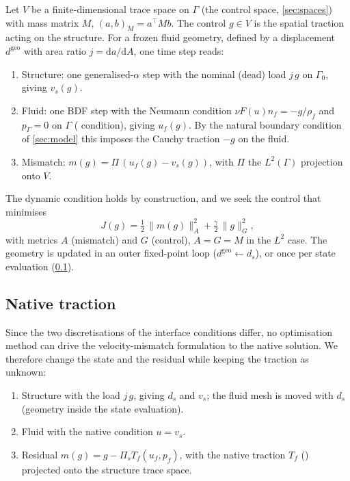 \documentclass[11pt,a4paper]{article}
\theoremstyle{definition}
\theoremstyle{remark}
\newcommand{\G}{\Gamma}
\newcommand{\M}{M}
\newcommand{\Pis}{\Pi_{s}}
\begin{document}
Let $V$ be a finite-dimensional trace space on $\G$ (the control space, \cref{sec:spaces}) with
mass matrix $\M$, $(a,b)_{\M}=a^{\top}\M b$. The control $g\in V$ is the spatial traction acting on
the structure. For a frozen fluid geometry, defined by a displacement $d^{\mathrm{geo}}$ with area
ratio $j=\mathrm{d}a/\mathrm{d}A$, one time step reads:
\begin{enumerate}
\item Structure: one generalised-$\alpha$ step with the nominal (dead) load $j\,g$ on $\G_0$,
giving $v_s(g)$.
\item Fluid: one BDF step with the Neumann condition $\nu F(u)n_f = -g/\rho_f$ and $p_\G=0$ on
$\G$ ( condition), giving $u_f(g)$. By the natural boundary condition of
\cref{sec:model} this imposes the Cauchy traction $-g$ on the fluid.
\item Mismatch: $m(g) = \Pi\,(u_f(g)-v_s(g))$, with $\Pi$ the $L^2(\G)$ projection onto $V$.
\end{enumerate}
The dynamic condition holds by construction, and we seek the control that minimises
\begin{equation}\label{eq:J}
  J(g) = \tfrac12\,\|m(g)\|_{A}^2 + \tfrac{\gamma}{2}\,\|g\|_{G}^2,
\end{equation}
with metrics $A$ (mismatch) and $G$ (control), $A=G=\M$ in the $L^2$ case. The geometry is updated
in an outer fixed-point loop ($d^{\mathrm{geo}}\leftarrow d_s$), or once per state evaluation
(\cref{sec:native}).

\subsection{Native traction}\label{sec:native}

Since the two discretisations of the interface conditions differ, no optimisation method can drive
the velocity-mismatch formulation to the native solution. We therefore change the state and the
residual while keeping the traction as unknown:
\begin{enumerate}
  \item Structure with the load $j\,g$, giving $d_s$ and $v_s$; the fluid mesh is moved with $d_s$
  (geometry inside the state evaluation).
  \item Fluid with the native  condition $u=v_s$.
  \item Residual $m(g) = g - \Pis T_f(u_f,p_f)$, with the native traction $T_f$
  () projected onto the structure trace space.
\end{enumerate}
\end{document}
